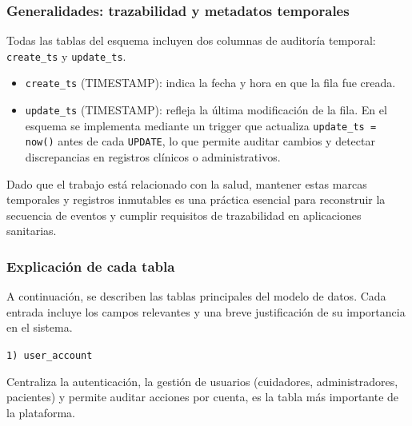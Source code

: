 \documentclass[12pt, a4paper]{article}
\begin{document}
\subsubsection{Generalidades: trazabilidad y metadatos temporales}

Todas las tablas del esquema incluyen dos columnas de auditoría temporal: \texttt{create\_ts} y \texttt{update\_ts}.  

\begin{itemize}
	\item \texttt{create\_ts} (TIMESTAMP): indica la fecha y hora en que la fila fue creada. 
	\item \texttt{update\_ts} (TIMESTAMP): refleja la última modificación de la fila. En el esquema se implementa mediante un trigger que actualiza \texttt{update\_ts = now()} antes de cada \texttt{UPDATE}, lo que permite auditar cambios y detectar discrepancias en registros clínicos o administrativos.
\end{itemize}

Dado que el trabajo está relacionado con la salud, mantener estas marcas temporales y registros inmutables es una práctica esencial para reconstruir la secuencia de eventos y cumplir requisitos de trazabilidad en aplicaciones sanitarias.

\subsubsection{Explicación de cada tabla}
A continuación, se describen las tablas principales del modelo de datos.  
Cada entrada incluye los campos relevantes y una breve justificación de su importancia en el sistema.



\texttt{1) user\_account}


 Centraliza la autenticación, la gestión de usuarios (cuidadores, administradores, pacientes) y permite auditar acciones por cuenta, es la tabla más importante de la plataforma.
\end{document}
